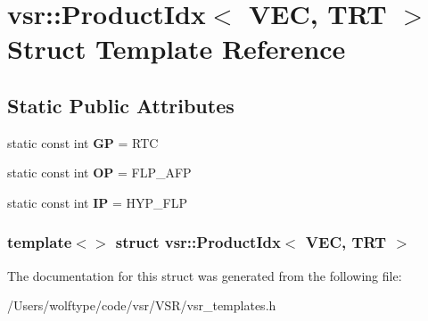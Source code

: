 \hypertarget{structvsr_1_1_product_idx_3_01_v_e_c_00_01_t_r_t_01_4}{\section{vsr\-:\-:Product\-Idx$<$ V\-E\-C, T\-R\-T $>$ Struct Template Reference}
\label{structvsr_1_1_product_idx_3_01_v_e_c_00_01_t_r_t_01_4}
}
\subsection*{Static Public Attributes}
\begin{DoxyCompactItemize}
\item 
\hypertarget{structvsr_1_1_product_idx_3_01_v_e_c_00_01_t_r_t_01_4_a6c4c67ab988f84eaea8fed5b577f9b77}{static const int {\bfseries G\-P} = R\-T\-C}\label{structvsr_1_1_product_idx_3_01_v_e_c_00_01_t_r_t_01_4_a6c4c67ab988f84eaea8fed5b577f9b77}

\item 
\hypertarget{structvsr_1_1_product_idx_3_01_v_e_c_00_01_t_r_t_01_4_a6351430c8c20a3ec10566bc2f652412a}{static const int {\bfseries O\-P} = F\-L\-P\-\_\-\-A\-F\-P}\label{structvsr_1_1_product_idx_3_01_v_e_c_00_01_t_r_t_01_4_a6351430c8c20a3ec10566bc2f652412a}

\item 
\hypertarget{structvsr_1_1_product_idx_3_01_v_e_c_00_01_t_r_t_01_4_ac6a41b24e97d7e3214d1144388309b97}{static const int {\bfseries I\-P} = H\-Y\-P\-\_\-\-F\-L\-P}\label{structvsr_1_1_product_idx_3_01_v_e_c_00_01_t_r_t_01_4_ac6a41b24e97d7e3214d1144388309b97}

\end{DoxyCompactItemize}
\subsubsection*{template$<$$>$ struct vsr\-::\-Product\-Idx$<$ V\-E\-C, T\-R\-T $>$}



The documentation for this struct was generated from the following file\-:\begin{DoxyCompactItemize}
\item 
/\-Users/wolftype/code/vsr/\-V\-S\-R/vsr\-\_\-templates.\-h\end{DoxyCompactItemize}
